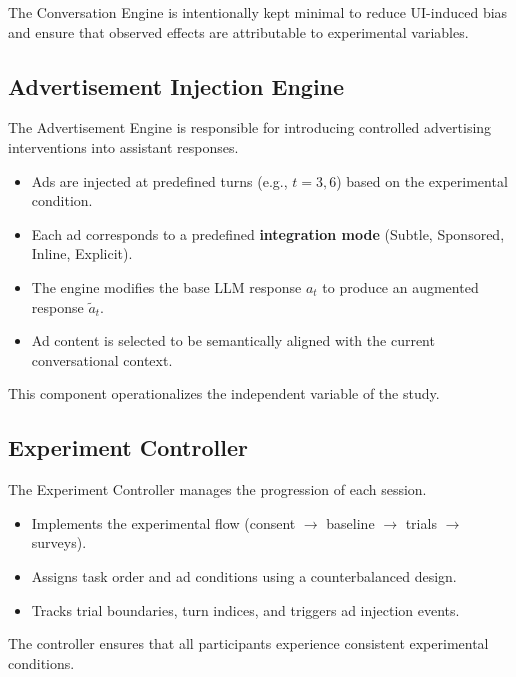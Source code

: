 \documentclass{article}
\begin{document}
The Conversation Engine is intentionally kept minimal to reduce UI-induced bias and ensure that observed effects are attributable to experimental variables.

\vspace{0.3cm}

\subsection{Advertisement Injection Engine}

The Advertisement Engine is responsible for introducing controlled advertising interventions into assistant responses.

\begin{itemize}
    \item Ads are injected at predefined turns (e.g., $t = 3, 6$) based on the experimental condition.
    \item Each ad corresponds to a predefined \textbf{integration mode} (Subtle, Sponsored, Inline, Explicit).
    \item The engine modifies the base LLM response $a_t$ to produce an augmented response $\tilde{a}_t$.
    \item Ad content is selected to be semantically aligned with the current conversational context.
\end{itemize}

This component operationalizes the independent variable of the study.

\vspace{0.3cm}

\subsection{Experiment Controller}

The Experiment Controller manages the progression of each session.

\begin{itemize}
    \item Implements the experimental flow (consent $\rightarrow$ baseline $\rightarrow$ trials $\rightarrow$ surveys).
    \item Assigns task order and ad conditions using a counterbalanced design.
    \item Tracks trial boundaries, turn indices, and triggers ad injection events.
\end{itemize}

The controller ensures that all participants experience consistent experimental conditions.
\end{document}
